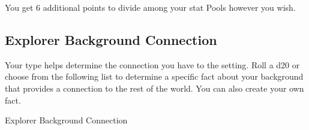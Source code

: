 \raggedright

You get 6 additional points to divide among your stat Pools however you wish.

\subsection{Explorer Background Connection}

Your type helps determine the connection you have to the setting. Roll a d20 or choose from the following list to determine a specific fact about your background that provides a connection to the rest of the world. You can also create your own fact.

\begin{table*}
\centering

\caption{Explorer Background Connection}
\label{tab:Explorer Background Connection}


\end{table*}
